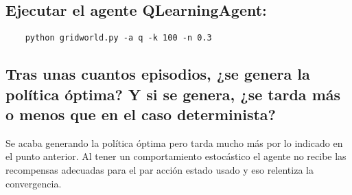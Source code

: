 \documentclass[12pt]{article}
\begin{document}
    \subsection{Ejecutar el agente QLearningAgent:}
    \begin{verbatim}
    python gridworld.py -a q -k 100 -n 0.3
    \end{verbatim}
    \subsection{Tras unas cuantos episodios, ¿se genera la política óptima? Y si se genera, ¿se tarda más o menos
    que en el caso determinista?}
    Se acaba generando la política óptima pero tarda mucho más por lo indicado en el punto anterior. Al tener un
    comportamiento estocástico el agente no recibe las recompensas adecuadas para el par acción estado usado y eso
    relentiza la convergencia.
\end{document}
